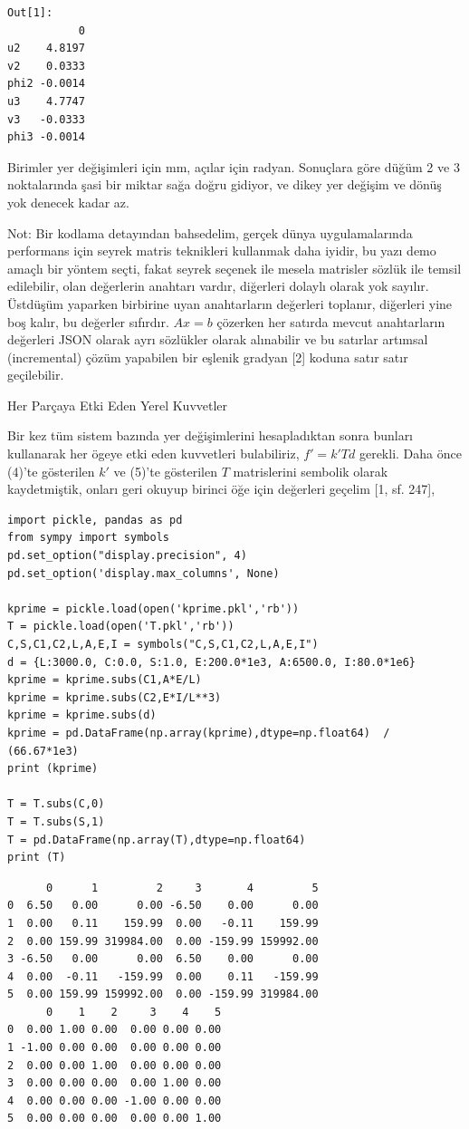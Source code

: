 \documentclass[12pt,fleqn]{article}\usepackage{../../common}
\begin{document}
\begin{verbatim}
Out[1]: 
           0
u2    4.8197
v2    0.0333
phi2 -0.0014
u3    4.7747
v3   -0.0333
phi3 -0.0014
\end{verbatim}

Birimler yer değişimleri için mm, açılar için radyan. Sonuçlara göre düğüm 2 ve
3 noktalarında şasi bir miktar sağa doğru gidiyor, ve dikey yer değişim ve dönüş
yok denecek kadar az.

Not: Bir kodlama detayından bahsedelim, gerçek dünya uygulamalarında performans
için seyrek matris teknikleri kullanmak daha iyidir, bu yazı demo amaçlı bir
yöntem seçti, fakat seyrek seçenek ile mesela matrisler sözlük ile temsil
edilebilir, olan değerlerin anahtarı vardır, diğerleri dolaylı olarak yok
sayılır. Üstdüşüm yaparken birbirine uyan anahtarların değerleri toplanır,
diğerleri yine boş kalır, bu değerler sıfırdır. $Ax=b$ çözerken her satırda
mevcut anahtarların değerleri JSON olarak ayrı sözlükler olarak alınabilir ve bu
satırlar artımsal (incremental) çözüm yapabilen bir eşlenik gradyan [2] koduna
satır satır geçilebilir.

Her Parçaya Etki Eden Yerel Kuvvetler

Bir kez tüm sistem bazında yer değişimlerini hesapladıktan sonra bunları
kullanarak her ögeye etki eden kuvvetleri bulabiliriz, $f' = k' T d$
gerekli. Daha önce (4)'te gösterilen $k'$ ve (5)'te gösterilen $T$ matrislerini
sembolik olarak kaydetmiştik, onları geri okuyup birinci öğe için değerleri
geçelim [1, sf. 247],

\begin{verbatim}
import pickle, pandas as pd
from sympy import symbols
pd.set_option("display.precision", 4)
pd.set_option('display.max_columns', None)

kprime = pickle.load(open('kprime.pkl','rb'))
T = pickle.load(open('T.pkl','rb'))
C,S,C1,C2,L,A,E,I = symbols("C,S,C1,C2,L,A,E,I")
d = {L:3000.0, C:0.0, S:1.0, E:200.0*1e3, A:6500.0, I:80.0*1e6}
kprime = kprime.subs(C1,A*E/L) 
kprime = kprime.subs(C2,E*I/L**3)
kprime = kprime.subs(d) 
kprime = pd.DataFrame(np.array(kprime),dtype=np.float64)  / (66.67*1e3)
print (kprime)

T = T.subs(C,0)
T = T.subs(S,1)
T = pd.DataFrame(np.array(T),dtype=np.float64)
print (T)
\end{verbatim}

\begin{verbatim}
      0      1         2     3       4         5
0  6.50   0.00      0.00 -6.50    0.00      0.00
1  0.00   0.11    159.99  0.00   -0.11    159.99
2  0.00 159.99 319984.00  0.00 -159.99 159992.00
3 -6.50   0.00      0.00  6.50    0.00      0.00
4  0.00  -0.11   -159.99  0.00    0.11   -159.99
5  0.00 159.99 159992.00  0.00 -159.99 319984.00
      0    1    2     3    4    5
0  0.00 1.00 0.00  0.00 0.00 0.00
1 -1.00 0.00 0.00  0.00 0.00 0.00
2  0.00 0.00 1.00  0.00 0.00 0.00
3  0.00 0.00 0.00  0.00 1.00 0.00
4  0.00 0.00 0.00 -1.00 0.00 0.00
5  0.00 0.00 0.00  0.00 0.00 1.00
\end{verbatim}
\end{document}
